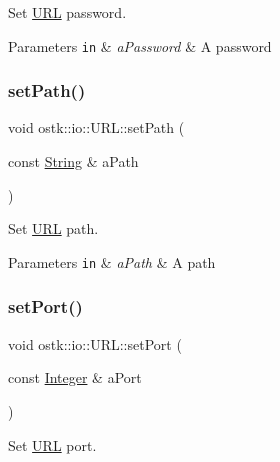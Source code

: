 Set \hyperlink{classostk_1_1io_1_1_u_r_l}{U\+RL} password. 


\begin{DoxyParams}[1]{Parameters}
\mbox{\tt in}  & {\em a\+Password} & A password \\
\hline
\end{DoxyParams}
\mbox{\label{classostk_1_1io_1_1_u_r_l_a9889bf7f7516b095adadebea4ba3ceae}} 
\subsubsection{\texorpdfstring{set\+Path()}{setPath()}}
{\footnotesize\ttfamily void ostk\+::io\+::\+U\+R\+L\+::set\+Path (\begin{DoxyParamCaption}\item[{const \hyperlink{namespaceostk_1_1io_a95d49b120613a7610cb1b4f03b1116b6}{String} \&}]{a\+Path }\end{DoxyParamCaption})}



Set \hyperlink{classostk_1_1io_1_1_u_r_l}{U\+RL} path. 


\begin{DoxyParams}[1]{Parameters}
\mbox{\tt in}  & {\em a\+Path} & A path \\
\hline
\end{DoxyParams}
\mbox{\label{classostk_1_1io_1_1_u_r_l_a991fe376c996ad6457ebbd8b976c44ec}} 
\subsubsection{\texorpdfstring{set\+Port()}{setPort()}}
{\footnotesize\ttfamily void ostk\+::io\+::\+U\+R\+L\+::set\+Port (\begin{DoxyParamCaption}\item[{const \hyperlink{namespaceostk_1_1io_a35328f680550d000b2754860bbe1d268}{Integer} \&}]{a\+Port }\end{DoxyParamCaption})}



Set \hyperlink{classostk_1_1io_1_1_u_r_l}{U\+RL} port. 


